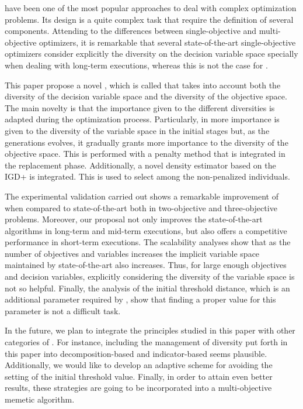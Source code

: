 \EAS{} have been one of the most popular approaches to deal with complex optimization problems.
%
Its design is a quite complex task that require the definition of several components.
%
Attending to the differences between single-objective and multi-objective optimizers, it is remarkable
that several state-of-the-art single-objective optimizers consider explicitly the diversity on the decision variable space specially
when dealing with long-term executions, whereas this is not the case for \MOEAS{}.
%
%
%

This paper propose a novel \MOEA{}, which is called \VSDMOEA{} that takes into account both the diversity of the decision variable space
and the diversity of the objective space.
%
The main novelty is that the importance given to the different diversities is adapted during the optimization process.
%
Particularly, in \VSDMOEA{} more importance is given to the diversity of the variable space in the initial stages
but, as the generations evolves, it gradually grants more importance to the diversity of the objective space.
%
This is performed with a penalty method that is integrated in the replacement phase.
%
Additionally, a novel density estimator based on the IGD+ is integrated.
%
This is used to select among the non-penalized individuals.

The experimental validation carried out shows a remarkable improvement of \VSDMOEA{} when compared to state-of-the-art \MOEAS{} both in
two-objective and three-objective problems.
%
Moreover, our proposal not only improves the state-of-the-art algorithms in long-term and mid-term executions,
but also offers a competitive performance in short-term executions.
%
The scalability analyses show that as the number of objectives and variables increases the implicit variable space maintained by state-of-the-art
\MOEAS{} also increases.
%
Thus, for large enough objectives and decision variables, explicitly considering the diversity of the variable space is not so helpful.
%
Finally, the analysis of the initial threshold distance, which is an additional parameter required by \VSDMOEA{}, show that finding a proper
value for this parameter is not a difficult task.

In the future, we plan to integrate the principles studied in this paper with other categories of \MOEAS{}.
%
For instance, including the management of diversity put forth in this paper into decomposition-based and indicator-based \MOEAS{} seems plausible.
%
Additionally, we would like to develop an adaptive scheme for avoiding the setting of the initial threshold value.
%
Finally, in order to attain even better results, these strategies are going to be incorporated into a multi-objective memetic algorithm.
%
